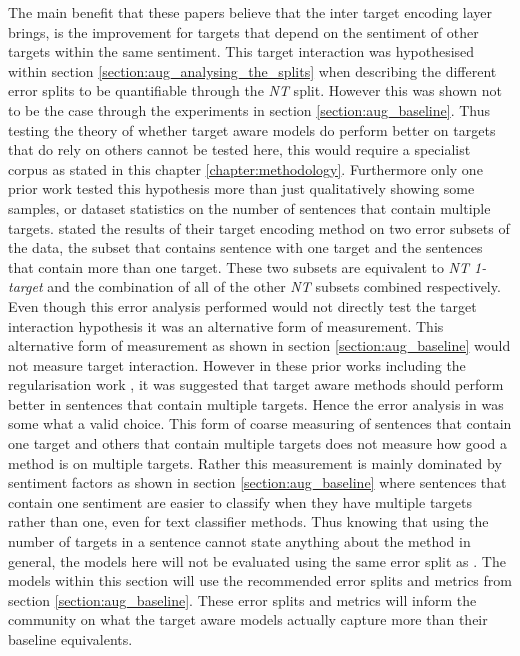 

The main benefit that these papers believe that the inter target encoding layer brings, is the improvement for targets that depend on the sentiment of other targets within the same sentiment. This target interaction was hypothesised within section \ref{section:aug_analysing_the_splits} when describing the different error splits to be quantifiable through the \textit{NT} split. However this was shown not to be the case through the experiments in section \ref{section:aug_baseline}. Thus testing the theory of whether target aware models do perform better on targets that do rely on others cannot be tested here, this would require a specialist corpus as stated in this chapter \ref{chapter:methodology}. Furthermore only one prior work \citep{majumder-etal-2018-iarm} tested this hypothesis more than just qualitatively showing some samples, or dataset statistics on the number of sentences that contain multiple targets. \citet{majumder-etal-2018-iarm} stated the results of their target encoding method on two error subsets of the data, the subset that contains sentence with one target and the sentences that contain more than one target. These two subsets are equivalent to \textit{NT 1-target} and the combination of all of the other \textit{NT} subsets combined respectively. Even though this error analysis \citet{majumder-etal-2018-iarm} performed would not directly test the target interaction hypothesis it was an alternative form of measurement. This alternative form of measurement as shown in section \ref{section:aug_baseline} would not measure target interaction. However in these prior works including the regularisation work \citep{fan-etal-2018-multi}, it was suggested that target aware methods should perform better in sentences that contain multiple targets. Hence the error analysis in \citet{majumder-etal-2018-iarm} was some what a valid choice. This form of coarse measuring of sentences that contain one target and others that contain multiple targets does not measure how good a method is on multiple targets. Rather this measurement is mainly dominated by sentiment factors as shown in section \ref{section:aug_baseline} where sentences that contain one sentiment are easier to classify when they have multiple targets rather than one, even for text classifier methods. Thus knowing that using the number of targets in a sentence cannot state anything about the method in general, the models here will not be evaluated using the same error split as \citet{majumder-etal-2018-iarm}. The models within this section will use the recommended error splits and metrics from section \ref{section:aug_baseline}. These error splits and metrics will inform the community on what the target aware models actually capture more than their baseline equivalents.

